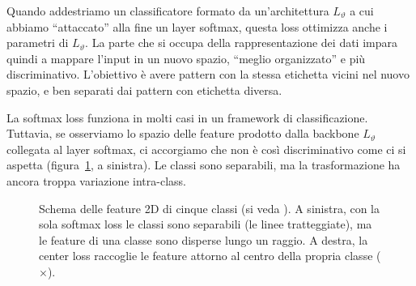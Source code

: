 Quando addestriamo un classificatore formato da un'architettura $L_\vartheta$ a cui abbiamo ``attaccato'' alla fine un layer softmax, questa loss ottimizza anche i parametri di $L_\vartheta$. La parte che si occupa della rappresentazione dei dati impara quindi a mappare l'input in un nuovo spazio, ``meglio organizzato'' e più discriminativo. L'obiettivo è avere pattern con la stessa etichetta vicini nel nuovo spazio, e ben separati dai pattern con etichetta diversa.

La softmax loss funziona in molti casi in un framework di classificazione. Tuttavia, se osserviamo lo spazio delle feature prodotto dalla backbone $L_\vartheta$ collegata al layer softmax, ci accorgiamo che non è così discriminativo come ci si aspetta (figura~\ref{fig:center-loss}, a sinistra). Le classi sono separabili, ma la trasformazione ha ancora troppa variazione intra-class.

\begin{figure}[htbp]
\centering
{}
\caption{Schema delle feature 2D di cinque classi (si veda \cite{Wen2016}). A sinistra, con la sola softmax loss le classi sono separabili (le linee tratteggiate), ma le feature di una classe sono disperse lungo un raggio. A destra, la center loss raccoglie le feature attorno al centro della propria classe ($\times$).}
\label{fig:center-loss}
\end{figure}

